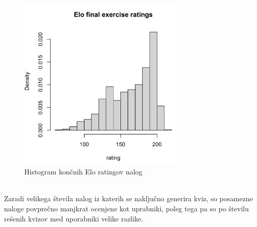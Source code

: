 \documentclass{IEEEtran}
\begin{document}
\begin{figure}[h!]
    \includegraphics[width=8cm]{ComputedELOe}
    \caption{Histogram končnih Elo ratingov nalog}%
    \label{fig:example}%
\end{figure}
\hfill
\\
Zaradi velikega števila nalog iz katerih se naključno generira kviz, so posamezne naloge povprečno manjkrat ocenjene kot uprabniki, poleg tega pa so po številu rešenih kvizov med uporabniki velike razlike. 

\end{document}
